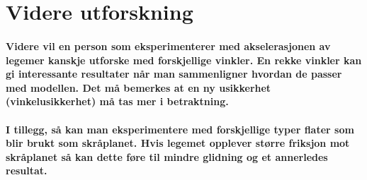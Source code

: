 \documentclass[12pt]{article}
\begin{document}
\section{Videre utforskning}

\paragraph{
    Videre vil en person som eksperimenterer med akselerasjonen av legemer kanskje utforske med forskjellige vinkler. En rekke vinkler kan gi interessante resultater når man sammenligner hvordan de passer med modellen. Det må bemerkes at en ny usikkerhet (vinkelusikkerhet) må tas mer i betraktning.}

\paragraph{
    I tillegg, så kan man eksperimentere med forskjellige typer flater som blir brukt som skråplanet. Hvis legemet opplever større friksjon mot skråplanet så kan dette føre til mindre glidning og et annerledes resultat. }
\end{document}
